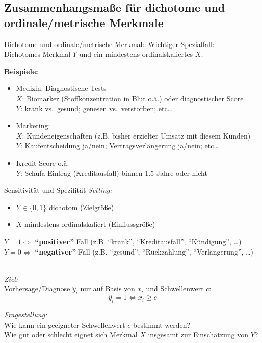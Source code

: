\documentclass[
  10pt,
  ignorenonframetext,
]{beamer}
\providecommand{\tightlist}{%
  \setlength{\itemsep}{0pt}\setlength{\parskip}{0pt}}
\begin{document}
\hypertarget{zusammenhangsmauxdfe-fuxfcr-dichotome-und-ordinalemetrische-merkmale}{%
\subsection{Zusammenhangsmaße für dichotome und ordinale/metrische
Merkmale}\label{zusammenhangsmauxdfe-fuxfcr-dichotome-und-ordinalemetrische-merkmale}}

\begin{frame}{Dichotome und ordinale/metrische Merkmale}
\protect\hypertarget{dichotome-und-ordinalemetrische-merkmale}{}
Wichtiger Spezialfall:\\
Dichotomes Merkmal \(Y\) und ein mindestens ordinalskaliertes \(X\).

\textbf{Beispiele:}

\begin{itemize}
\item
  Medizin: Diagnostische Tests\\
  \(X\): Biomarker (Stoffkonzentration in Blut o.ä.) oder diagnostischer
  Score\\
  \(Y\): krank vs.~gesund; genesen vs.~verstorben; etc\ldots{}
\item
  Marketing:\\
  \(X\): Kundeneigenschaften (z.B. bisher erzielter Umsatz mit diesem
  Kunden)\\
  \(Y\): Kaufentscheidung ja/nein; Vertragsverlängerung ja/nein;
  etc\ldots{}
\item
  Kredit-Score o.ä.\\
  \(Y\): Schufa-Eintrag (Kreditausfall) binnen 1.5 Jahre oder nicht
\end{itemize}
\end{frame}

\begin{frame}{Sensitivität und Spezifität}
\protect\hypertarget{sensitivituxe4t-und-spezifituxe4t}{}
\emph{Setting:}

\begin{itemize}
\tightlist
\item
  \(Y \in \{0, 1\}\) dichotom (Zielgröße)
\item
  \(X\) mindestens ordinalskaliert (Einflussgröße)
\end{itemize}

\(Y=1 \iff\) \textbf{``positiver''} Fall (z.B. ``krank'',
``Kreditausfall'', ``Kündigung'', \ldots)\\
\(Y=0 \iff\) \textbf{``negativer''} Fall (z.B. ``gesund'',
``Rückzahlung'', ``Verlängerung'', \ldots)\\
\strut \\

\emph{Ziel:}\\
Vorhersage/Diagnose \(\hat{y}_{i}\) nur auf Basis von \(x_i\) und
Schwellenwert \(c\): \[\hat{y}_{i} = 1\iff x_{i}\geq c\]

\emph{Fragestellung:}\\
Wie kann ein geeigneter Schwellenwert \(c\) bestimmt werden?\\
Wie gut oder schlecht eignet sich Merkmal \(X\) insgesamt zur
Einschätzung von \(Y\)?
\end{frame}
\end{document}
